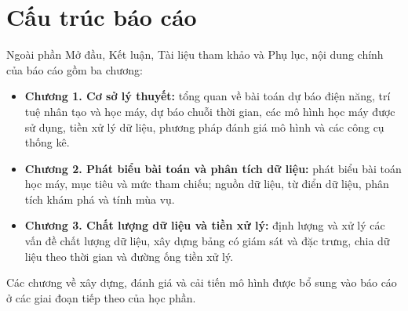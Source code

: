 \documentclass[../main.tex]{subfiles}
\begin{document}
\section*{Cấu trúc báo cáo}
Ngoài phần Mở đầu, Kết luận, Tài liệu tham khảo và Phụ lục, nội dung chính của báo cáo gồm ba chương:
\begin{itemize}
    \item \textbf{Chương 1. Cơ sở lý thuyết:} tổng quan về bài toán dự báo điện năng, trí tuệ nhân tạo và học máy, dự báo chuỗi thời gian, các mô hình học máy được sử dụng, tiền xử lý dữ liệu, phương pháp đánh giá mô hình và các công cụ thống kê.
    \item \textbf{Chương 2. Phát biểu bài toán và phân tích dữ liệu:} phát biểu bài toán học máy, mục tiêu và mức tham chiếu; nguồn dữ liệu, từ điển dữ liệu, phân tích khám phá và tính mùa vụ.
    \item \textbf{Chương 3. Chất lượng dữ liệu và tiền xử lý:} định lượng và xử lý các vấn đề chất lượng dữ liệu, xây dựng bảng có giám sát và đặc trưng, chia dữ liệu theo thời gian và đường ống tiền xử lý.
\end{itemize}
Các chương về xây dựng, đánh giá và cải tiến mô hình được bổ sung vào báo cáo ở các giai đoạn tiếp theo của học phần.
\end{document}
